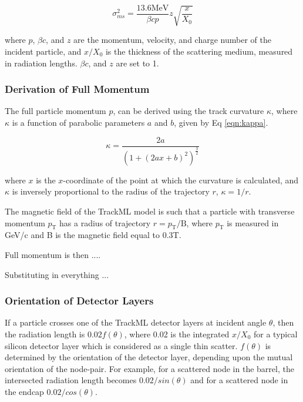 

\begin{equation}
    \sigma_{ms}^{2} = \frac{13.6 \text{MeV}}{\beta c p} z \sqrt{\frac{x}{X_0}}
    \label{eqn:simplified-moliere-equation}
\end{equation}

where $p$, $\beta c$, and $z$ are the momentum, velocity, and charge number of the incident particle, and $x/X_0$ is the thickness of the scattering medium, measured in radiation lengths. $\beta c$, and $z$ are set to 1. 

\subsubsection{Derivation of Full Momentum}
The full particle momentum $p$, can be derived using the track curvature $\kappa$, where $\kappa$ is a function of parabolic parameters $a$ and $b$, given by Eq \eqref{eqn:kappa}. 

\begin{equation}
\kappa = \frac{2a}{(1 + (2ax + b)^2)^{\frac{3}{2}}}
\label{eqn:kappa}
\end{equation}

where $x$ is the $x$-coordinate of the point at which the curvature is calculated, and $\kappa$ is inversely proportional to the radius of the trajectory $r$, $\kappa = 1/r$.

The magnetic field of the TrackML model is such that a particle with transverse momentum $p_\text{T}$ has a radius of trajectory $r = p_\text{T} / \text{B} $, where $p_\text{T}$ is measured in GeV/c and B is the magnetic field equal to 0.3T. 

Full momentum is then ....

Substituting in everything ...


\subsubsection{Orientation of Detector Layers}

If a particle crosses one of the TrackML detector layers at incident angle $\theta$, then the radiation length is $0.02 f(\theta)$, where 0.02 is the integrated $x/X_0$ for a typical silicon detector layer which is considered as a single thin scatter. $f(\theta)$ is determined by the orientation of the detector layer, depending upon the mutual orientation of the node-pair. For example, for a scattered node in the barrel, the intersected radiation length becomes $0.02 / sin(\theta)$ and for a scattered node in the endcap $0.02 / cos(\theta)$.



